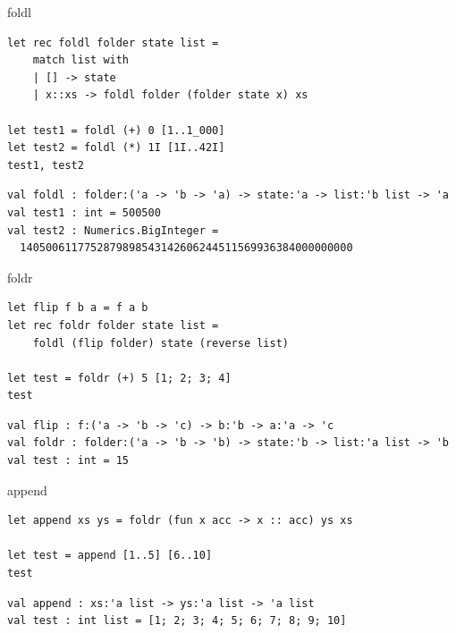 \documentclass[t]{beamer}
\begin{document}
\begin{frame}[label={sec:orgb972daa},fragile]{foldl}
 \begin{verbatim}
let rec foldl folder state list = 
    match list with
    | [] -> state
    | x::xs -> foldl folder (folder state x) xs

let test1 = foldl (+) 0 [1..1_000]
let test2 = foldl (*) 1I [1I..42I]
test1, test2
\end{verbatim}

\begin{verbatim}
val foldl : folder:('a -> 'b -> 'a) -> state:'a -> list:'b list -> 'a
val test1 : int = 500500
val test2 : Numerics.BigInteger =
  1405006117752879898543142606244511569936384000000000
\end{verbatim}
\end{frame}

\begin{frame}[label={sec:org7523ecf},fragile]{foldr}
 \begin{verbatim}
let flip f b a = f a b 
let rec foldr folder state list = 
    foldl (flip folder) state (reverse list)

let test = foldr (+) 5 [1; 2; 3; 4]
test
\end{verbatim}

\begin{verbatim}
val flip : f:('a -> 'b -> 'c) -> b:'b -> a:'a -> 'c
val foldr : folder:('a -> 'b -> 'b) -> state:'b -> list:'a list -> 'b
val test : int = 15
\end{verbatim}
\end{frame}

\begin{frame}[label={sec:orgb520d7a},fragile]{append}
 \begin{verbatim}
let append xs ys = foldr (fun x acc -> x :: acc) ys xs

let test = append [1..5] [6..10] 
test
\end{verbatim}

\begin{verbatim}
val append : xs:'a list -> ys:'a list -> 'a list
val test : int list = [1; 2; 3; 4; 5; 6; 7; 8; 9; 10]
\end{verbatim}
\end{frame}
\end{document}
